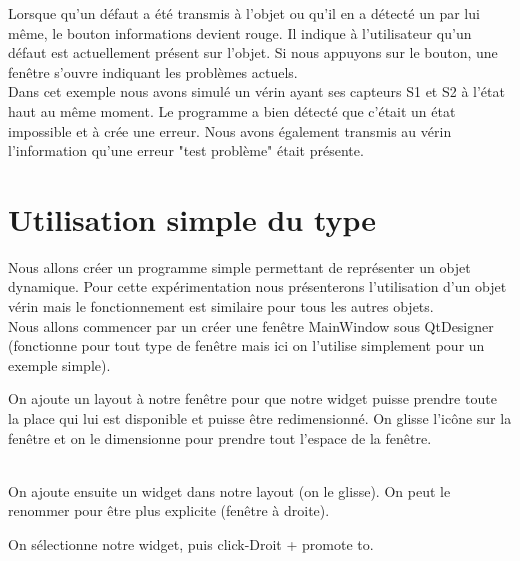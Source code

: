 \documentclass[12pt]{report}    %
\begin{document}

Lorsque qu'un défaut a été transmis à l'objet ou qu'il en a détecté un par lui même, le bouton informations devient rouge. Il indique à l'utilisateur qu'un défaut est actuellement présent sur l'objet. Si nous appuyons sur le bouton, une fenêtre s'ouvre indiquant les problèmes actuels. \\

Dans cet exemple nous avons simulé un vérin ayant ses capteurs S1 et S2 à l'état haut au même moment. Le programme a bien détecté que c'était un état impossible et à crée une erreur. Nous avons également transmis au vérin l'information qu'une erreur "test problème" était présente. 
 
 
 
 
 
 
 
 
 
 
\section{Utilisation simple du type}

Nous allons créer un programme simple permettant de représenter un objet dynamique. Pour cette expérimentation nous présenterons l'utilisation d'un objet vérin mais le fonctionnement est similaire pour tous les autres objets.\\

Nous allons commencer par un créer une fenêtre MainWindow sous QtDesigner (fonctionne pour tout type de fenêtre mais ici on l'utilise simplement pour un exemple simple).


On ajoute un layout à notre fenêtre pour que notre widget puisse prendre toute la place qui lui est disponible et puisse être redimensionné. On glisse l'icône sur la fenêtre et on le dimensionne pour prendre tout l'espace de la fenêtre.

\\

On ajoute ensuite un widget dans notre layout (on le glisse). On peut le renommer pour être plus explicite (fenêtre à droite).


On sélectionne notre widget, puis click-Droit + promote to. 
\end{document}
